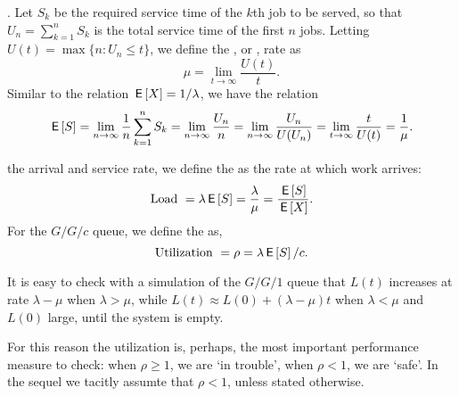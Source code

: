 .
Let $S_k$ be the required service time of the $k$th job to be served, so that $U_n = \sum_{k=1}^n S_k$ is the total service time of the first $n$ jobs.
Letting $ U(t) = \max\{n: U_n \leq t\}$, we define the , or , rate as
\begin{equation*}
 \mu = \lim_{t\to\infty} \frac{U(t)}t.
\end{equation*}
Similar to the relation  $\,\mathsf{E}\left[X\right]= 1/\lambda$, we have the relation
\begin{equation*}
 \,\mathsf{E}\left[S\right] = \lim_{n\to\infty} \frac 1 n \sum_{k=1}^n S_k = \lim_{n\to\infty} \frac{U_n}{n} = \lim_{n\to\infty} \frac{U_n}{U(U_n)} = \lim_{t\to\infty} \frac t{U(t)} = \frac 1 \mu.
\end{equation*}




 the arrival and service rate, we define the  as  the rate at which work arrives:
\begin{equation*}
\textrm{Load } =  \lambda \,\mathsf{E}\left[S\right] =\frac{\lambda}{\mu} = \frac{\,\mathsf{E}\left[S\right]}{\,\mathsf{E}\left[X\right]}.
\end{equation*}
For the $G/G/c$ queue, we define the  as,
\begin{equation*}
\textrm{Utilization } = \rho=\lambda \,\mathsf{E}\left[S\right] /c.
\end{equation*}

It is easy to check  with a simulation of the $G/G/1$ queue that $L(t)$ increases at rate $\lambda-\mu$ when $\lambda > \mu$, while $L(t) \approx L(0) + (\lambda - \mu)t$ when $\lambda< \mu$ and $L(0)$ large, until the system is empty.

For this reason the utilization is, perhaps, the most important performance measure to check: when $\rho\geq 1$, we are `in trouble', when $\rho < 1$, we are `safe'.
In the sequel we tacitly assumte that $\rho<1$, unless stated otherwise.



